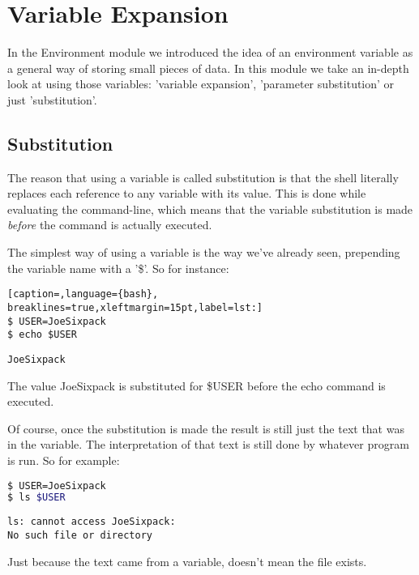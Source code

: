 \section{Variable Expansion}
In the Environment module we introduced the idea of an environment variable as
a general way of storing small pieces of data. In this module we take an
in-depth look at using those variables: 'variable expansion', 'parameter
substitution' or just 'substitution'.

\subsection{Substitution}
The reason that using a variable is called substitution is that the shell
literally replaces each reference to any variable with its value. This is done
while evaluating the command-line, which means that the variable substitution
is made \emph{before} the command is actually executed.

The simplest way of using a variable is the way we've already seen, prepending
the variable name with a '\$'. So for instance:
\lstset{basicstyle=\scriptsize, numbers=left, captionpos=b, tabsize=4}
\begin{lstlisting}[caption=,language={bash},
breaklines=true,xleftmargin=15pt,label=lst:]
$ USER=JoeSixpack
$ echo $USER
\end{lstlisting}
\scriptsize
\begin{verbatim}
JoeSixpack
\end{verbatim}
\normalsize

The value JoeSixpack is substituted for \$USER before the echo command is
executed.

Of course, once the substitution is made the result is still just the text that
was in the variable. The interpretation of that text is still done by whatever
program is run. So for example:
\lstset{basicstyle=\scriptsize, numbers=left, captionpos=b, tabsize=4}
\begin{lstlisting}[caption=Variables do not make magic,language={bash},
breaklines=true,xleftmargin=15pt,label=lst:Variables do not make magic]
$ USER=JoeSixpack
$ ls $USER
\end{lstlisting}
\scriptsize
\begin{verbatim}
ls: cannot access JoeSixpack:
No such file or directory
\end{verbatim}
\normalsize

Just because the text came from a variable, doesn't mean the file exists.

